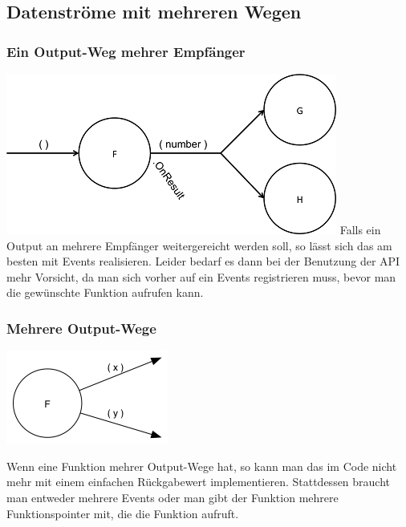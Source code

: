 \documentclass[11pt]{article}
\begin{document}
\subsection{Datenströme mit mehreren Wegen}
\label{sec:orgheadline33}
\subsubsection{Ein Output-Weg mehrer Empfänger}
\label{sec:orgheadline30}
\includegraphics[width=.9\linewidth]{./img/diagramOut1to2.png}
Falls ein Output an mehrere Empfänger weitergereicht werden soll, so lässt sich das am besten mit Events realisieren.
Leider bedarf es dann bei der Benutzung der API mehr Vorsicht, da man sich vorher auf ein Events registrieren muss, bevor man
die gewünschte Funktion aufrufen kann.
\subsubsection{Mehrere Output-Wege}
\label{sec:orgheadline32}

\includegraphics[width=.9\linewidth]{./img/diagramOut2.png}

Wenn eine Funktion mehrer Output-Wege hat, so kann man das im Code nicht mehr mit einem einfachen Rückgabewert implementieren.
Stattdessen braucht man entweder mehrere Events oder man gibt der Funktion mehrere Funktionspointer mit, die die Funktion aufruft.
\end{document}
